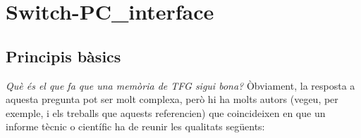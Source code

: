
\chapter{Switch-PC_interface}\label{memoria}

\section{Principis bàsics}

\emph{Què és el que fa que una memòria de \ac{TFG} sigui bona?} Òbviament, la resposta a aquesta pregunta pot ser molt complexa, però hi ha molts autors (vegeu, per exemple, \cite{Perelman01,Malvar08} i els treballs que aquests referencien) que coincideixen en que un informe tècnic o científic ha de reunir les qualitats següents:
